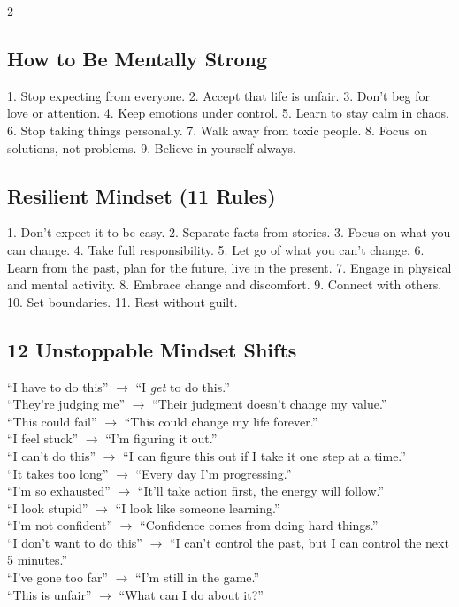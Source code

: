\documentclass[10pt,a4paper]{article}
\begin{document}
\begin{multicols}{2}
\subsection{How to Be Mentally Strong}
1. Stop expecting from everyone. 2. Accept that life is unfair. 3. Don't beg for love or attention. 4. Keep emotions under control. 5. Learn to stay calm in chaos. 6. Stop taking things personally. 7. Walk away from toxic people. 8. Focus on solutions, not problems. 9. Believe in yourself always.

\subsection{Resilient Mindset (11 Rules)}
1. Don't expect it to be easy. 2. Separate facts from stories. 3. Focus on what you can change. 4. Take full responsibility. 5. Let go of what you can't change. 6. Learn from the past, plan for the future, live in the present. 7. Engage in physical and mental activity. 8. Embrace change and discomfort. 9. Connect with others. 10. Set boundaries. 11. Rest without guilt.

\subsection{12 Unstoppable Mindset Shifts}
``I have to do this'' $\to$ ``I \emph{get} to do this.''\\
``They're judging me'' $\to$ ``Their judgment doesn't change my value.''\\
``This could fail'' $\to$ ``This could change my life forever.''\\
``I feel stuck'' $\to$ ``I'm figuring it out.''\\
``I can't do this'' $\to$ ``I can figure this out if I take it one step at a time.''\\
``It takes too long'' $\to$ ``Every day I'm progressing.''\\
``I'm so exhausted'' $\to$ ``It'll take action first, the energy will follow.''\\
``I look stupid'' $\to$ ``I look like someone learning.''\\
``I'm not confident'' $\to$ ``Confidence comes from doing hard things.''\\
``I don't want to do this'' $\to$ ``I can't control the past, but I can control the next 5 minutes.''\\
``I've gone too far'' $\to$ ``I'm still in the game.''\\
``This is unfair'' $\to$ ``What can I do about it?''


\end{multicols}
\end{document}
